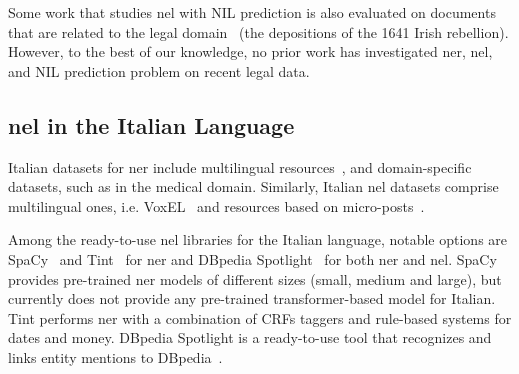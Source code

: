 Some work that studies \ac{nel} with NIL prediction is also evaluated on documents that are related to the legal domain~\cite{klie-etal-2020-zero} (the depositions of the 1641 Irish rebellion). %
However, to the best of our knowledge, no prior work has investigated \ac{ner}, \ac{nel}, and NIL prediction problem on recent legal data. 

\subsection{\ac{nel} in the Italian Language}
Italian datasets for \ac{ner} include multilingual resources~\cite{tedeschi-navigli-2022-multinerd,NOTHMAN2013151}, and domain-specific datasets, such as \cite{CATELLI2020106779} in the medical domain.
Similarly, Italian \ac{nel} datasets comprise multilingual ones, i.e. VoxEL~\cite{rosales2018voxel} and resources based on micro-posts~\cite{basile2016neelit}.

Among the ready-to-use \ac{nel} libraries for the Italian language, notable options are SpaCy~\cite{honnibal2020spacy} and Tint~\cite{2018tint2} for \ac{ner} and DBpedia Spotlight~\cite{mendes_2011_spotlight,Daiber2013spotlight} for both \ac{ner} and \ac{nel}.
SpaCy provides pre-trained \ac{ner} models of different sizes (small, medium and large), but currently does not provide any pre-trained transformer-based model for Italian. Tint performs \ac{ner} with a combination of CRFs taggers and rule-based systems for dates and money.
DBpedia Spotlight is a ready-to-use tool that recognizes and links entity mentions to DBpedia~\cite{dbpedia}.

